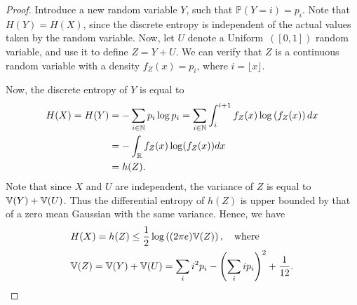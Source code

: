         \begin{proof}
            Introduce a new random variable $Y$, such that $\mathbb{P}(Y=i) = p_i$. Note that $H(Y) = H(X)$, since the discrete entropy is independent of the actual values taken by the random variable. Now, let $U$ denote a Uniform~$([0,1])$ random variable, and use it to define $Z = Y + U$. 
            We can verify that $Z$ is a continuous random variable with a density $f_Z(x) = p_i$, where $i = \lfloor x \rfloor$. 

            Now, the discrete entropy of $Y$ is equal to 
            \begin{align}
                H(X) = H(Y) &= -\sum_{i \in \mathbb{N}} p_i \log p_i = \sum_{i \in \mathbb{N}} \int_{i}^{i+1} f_Z(x) \log \left( f_Z(x) \right) dx  \\
                & = -\int_{\mathbb{R}} f_Z(x) \log(f_Z(x)) dx \\
                & = h(Z). 
            \end{align}
            Note that since $X$ and $U$ are independent, the variance of $Z$ is equal to $\mathbb{V}(Y) + \mathbb{V}(U)$. Thus the differential entropy of $h(Z)$ is upper bounded by that of a zero mean Gaussian with the same variance. Hence, we have 
            \begin{align}
                &H(X) = h(Z) \leq \frac{1}{2} \log \left( (2\pi e) \mathbb{V}(Z) \right), \quad \text{where} \\
                & \mathbb{V}(Z) = \mathbb{V}(Y) + \mathbb{V}(U) = \sum_{i} i^2 p_i - \left( \sum_{i} i p_i \right)^2 + \frac{1}{12}. 
            \end{align}
        \end{proof}

        
